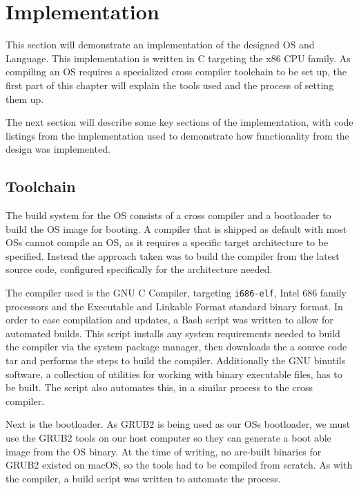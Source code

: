 \documentclass[10pt]{report}
\begin{document}
\chapter{Implementation}
This section will demonstrate an implementation of the designed OS and Language. This implementation is written in C targeting the x86 CPU family. As compiling an OS requires a specialized cross compiler toolchain to be set up, the first part of this chapter will explain the tools used and the process of setting them up.

The next section will describe some key sections of the implementation, with code listings from the implementation used to demonstrate how functionality from the design was implemented.

\section{Toolchain}
The build system for the OS consists of a cross compiler and a bootloader to build the OS image for booting. A compiler that is shipped as default with most OSs cannot compile an OS, as it requires a specific target architecture to be specified. Instead the approach taken was to build the compiler from the latest source code, configured specifically for the architecture needed.

The compiler used is the GNU C Compiler, targeting \texttt{i686-elf}, Intel 686 family processors and the Executable and Linkable Format standard binary format. In order to ease compilation and updates, a Bash script was written to allow for automated builds. This script installs any system requirements needed to build the compiler via the system package manager, then downloads the a source code tar and performs the steps to build the compiler. Additionally the GNU binutils software, a collection of utilities for working with binary executable files, has to be built. The script also automates this, in a similar process to the cross compiler.

  

Next is the bootloader. As GRUB2 is being used as our OSs bootloader, we must use the GRUB2 tools on our host computer so they can generate a boot able image from the OS binary. At the time of writing, no are-built binaries for GRUB2 existed on macOS, so the tools had to be compiled from scratch. As with the compiler, a build script was written to automate the process.
\end{document}
